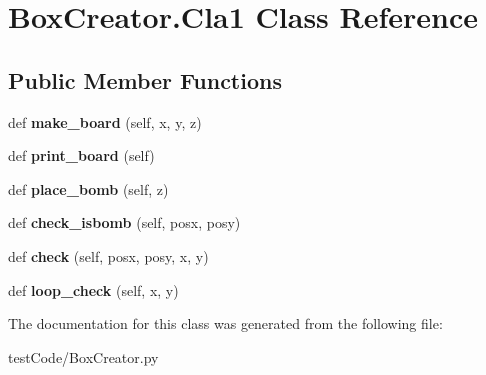 \hypertarget{class_box_creator_1_1_cla1}{}\section{Box\+Creator.\+Cla1 Class Reference}
\label{class_box_creator_1_1_cla1}
\subsection*{Public Member Functions}
\begin{DoxyCompactItemize}
\item 
\mbox{\label{class_box_creator_1_1_cla1_a12807061f13576d2711e86bcb5935fe9}} 
def {\bfseries make\+\_\+board} (self, x, y, z)
\item 
\mbox{\label{class_box_creator_1_1_cla1_a66a67420acc87d9a393617d6d6633810}} 
def {\bfseries print\+\_\+board} (self)
\item 
\mbox{\label{class_box_creator_1_1_cla1_ac8761bf13a24eabda35c56e9627462fb}} 
def {\bfseries place\+\_\+bomb} (self, z)
\item 
\mbox{\label{class_box_creator_1_1_cla1_a31b342197cdeacf32726c4e10c437d69}} 
def {\bfseries check\+\_\+isbomb} (self, posx, posy)
\item 
\mbox{\label{class_box_creator_1_1_cla1_a7499b0b41adf85133726d2319a9a7311}} 
def {\bfseries check} (self, posx, posy, x, y)
\item 
\mbox{\label{class_box_creator_1_1_cla1_aa115a78d18eafd0648504512848bcc46}} 
def {\bfseries loop\+\_\+check} (self, x, y)
\end{DoxyCompactItemize}


The documentation for this class was generated from the following file\+:\begin{DoxyCompactItemize}
\item 
test\+Code/Box\+Creator.\+py\end{DoxyCompactItemize}
